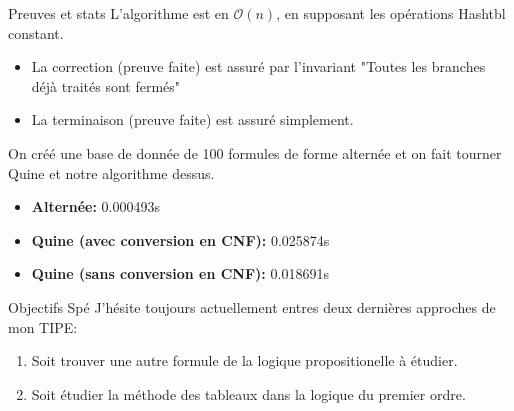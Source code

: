 \documentclass[]{beamer}
\begin{document}
\begin{frame}{Preuves et stats}
    L'algorithme est en $\mathcal{O}(n)$, en supposant les opérations Hashtbl constant.
    \pause
    \begin{itemize}
        \item La correction (preuve faite) est assuré par l'invariant "Toutes les branches déjà traités sont fermés"
        \item La terminaison (preuve faite) est assuré simplement.
    \end{itemize}
    \pause
    On créé une base de donnée de 100 formules de forme alternée et on fait tourner Quine et notre algorithme dessus.
    \begin{itemize}
        \item \textbf{Alternée:} 0.000493s
        \item \textbf{Quine (avec conversion en CNF):} 0.025874s
        \item \textbf{Quine (sans conversion en CNF):} 0.018691s
    \end{itemize}  
\end{frame}
 
\begin{frame}{Objectifs Spé}
    J'hésite toujours actuellement entres deux dernières approches de mon TIPE:
    \begin{enumerate}
        \item Soit trouver une autre formule de la logique propositionelle à étudier.
        \item Soit étudier la méthode des tableaux dans la logique du premier ordre.
    \end{enumerate}
\end{frame}
\end{document}
